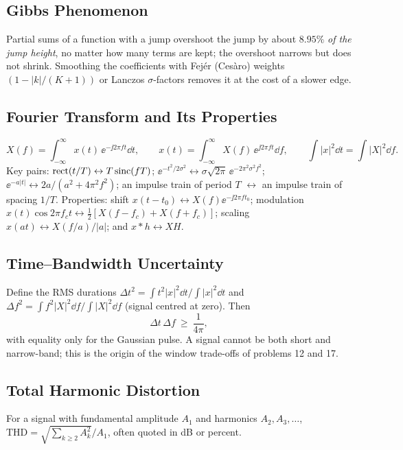 \documentclass[11pt,a4paper]{article}
\begin{document}
\subsection{Gibbs Phenomenon}
Partial sums of a function with a jump overshoot the jump by about $8.95\%$ \emph{of the jump height}, no matter how many terms are kept; the overshoot narrows but does not shrink. Smoothing the coefficients with Fej\'er (Ces\`aro) weights $(1-|k|/(K+1))$ or Lanczos $\sigma$-factors removes it at the cost of a slower edge.

\subsection{Fourier Transform and Its Properties}
\begin{equation}
  X(f)=\int_{-\infty}^{\infty}x(t)\,\ee^{-\jj2\pi ft}\dd t,\qquad x(t)=\int_{-\infty}^{\infty}X(f)\,\ee^{\jj2\pi ft}\dd f,\qquad \int|x|^2\dd t=\int|X|^2\dd f.
  \label{eq:ft}
\end{equation}
Key pairs: $\operatorname{rect}(t/T)\leftrightarrow T\operatorname{sinc}(fT)$; $\ee^{-t^2/2\sigma^2}\leftrightarrow\sigma\sqrt{2\pi}\,\ee^{-2\pi^2\sigma^2f^2}$; $\ee^{-a|t|}\leftrightarrow2a/(a^2+4\pi^2f^2)$; an impulse train of period $T$ $\leftrightarrow$ an impulse train of spacing $1/T$. Properties: shift $x(t-t_0)\leftrightarrow X(f)\ee^{-\jj2\pi ft_0}$; modulation $x(t)\cos2\pi f_ct\leftrightarrow\tfrac12[X(f-f_c)+X(f+f_c)]$; scaling $x(at)\leftrightarrow X(f/a)/|a|$; and $x*h\leftrightarrow XH$.

\subsection{Time--Bandwidth Uncertainty}
Define the RMS durations $\Delta t^2=\int t^2|x|^2\dd t/\int|x|^2\dd t$ and $\Delta f^2=\int f^2|X|^2\dd f/\int|X|^2\dd f$ (signal centred at zero). Then
\begin{equation}
  \Delta t\,\Delta f\ \ge\ \frac1{4\pi},
  \label{eq:unc}
\end{equation}
with equality only for the Gaussian pulse. A signal cannot be both short and narrow-band; this is the origin of the window trade-offs of problems 12 and 17.

\subsection{Total Harmonic Distortion}
For a signal with fundamental amplitude $A_1$ and harmonics $A_2,A_3,\dots$, $\mathrm{THD}=\sqrt{\sum_{k\ge2}A_k^2}/A_1$, often quoted in dB or percent.
\end{document}
